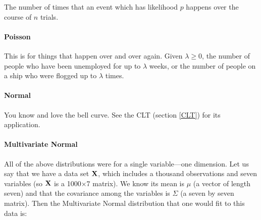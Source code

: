 The number of times that an event which has likelihood $p$ happens over the
course of $n$ trials.


\paragraph{Poisson}

This is for things that happen over and over again. Given
$\lambda\geq0$, 
the number of people who have been unemployed for
up to $\lambda$ weeks,
or the number of people on a ship who were flogged up to
$\lambda$ times. 


\paragraph{Normal}

You know and love the bell curve. See the CLT (section \ref{CLT}) for
its application.


\paragraph{Multivariate Normal}
All of the above distributions were for a single variable---one
dimension. Let us say that we have a data set ${\bf X}$, which includes a
thousand observations and seven variables (so ${\bf X}$ is a 1000$\times$7
matrix). We know its mean is
$\mu$ (a vector of length seven) and that the covariance among the
variables is $\Sigma$ (a seven by seven matrix). Then the Multivariate
Normal distribution that one would fit to this data is:


